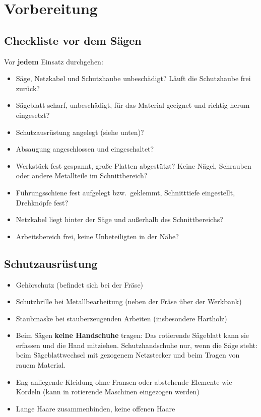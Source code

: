 \documentclass{\basedir/fablab-document}
\begin{document}
	\section{Vorbereitung}

	\subsection{Checkliste vor dem Sägen}
	Vor \textbf{jedem} Einsatz durchgehen:
	\begin{itemize}
		\item Säge, Netzkabel und Schutzhaube unbeschädigt? Läuft die Schutzhaube frei zurück?
		\item Sägeblatt scharf, unbeschädigt, für das Material geeignet und richtig herum eingesetzt?
		\item Schutzausrüstung angelegt (siehe unten)?
		\item Absaugung angeschlossen und eingeschaltet?
		\item Werkstück fest gespannt, große Platten abgestützt? Keine Nägel, Schrauben oder andere Metallteile im Schnittbereich?
		\item Führungsschiene fest aufgelegt bzw.\ geklemmt, Schnitttiefe eingestellt, Drehknöpfe fest?
		\item Netzkabel liegt hinter der Säge und außerhalb des Schnittbereichs?
		\item Arbeitsbereich frei, keine Unbeteiligten in der Nähe?
	\end{itemize}

	\subsection{Schutzausrüstung}
	\begin{itemize}
		\item Gehörschutz (befindet sich bei der Fräse)
		\item Schutzbrille bei Metallbearbeitung (neben der Fräse über der Werkbank)
		\item Staubmaske bei stauberzeugenden Arbeiten (insbesondere Hartholz)
		\item Beim Sägen \textbf{keine Handschuhe} tragen: Das rotierende Sägeblatt kann sie erfassen und die Hand mitziehen. Schutzhandschuhe nur, wenn die Säge steht: beim Sägeblattwechsel mit gezogenem Netzstecker und beim Tragen von rauem Material.
		\item Eng anliegende Kleidung ohne Fransen oder abstehende Elemente wie Kordeln (kann in rotierende Maschinen eingezogen werden)
		\item Lange Haare zusammenbinden, keine offenen Haare
	\end{itemize}
\end{document}
